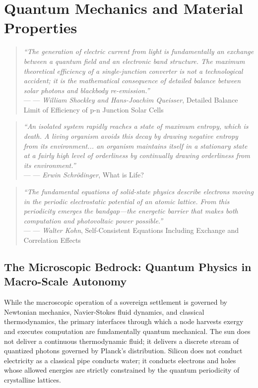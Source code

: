 \chapter{Quantum Mechanics and Material Properties}
\label{chap:quantum_mechanics}

\providecommand{\epigraph}[2]{%
  \begin{quote}
    \textit{#1} \\
    \raggedleft--- #2
  \end{quote}
}

\epigraph{
    ``The generation of electric current from light is fundamentally an exchange between a quantum field and an electronic band structure. The maximum theoretical efficiency of a single-junction converter is not a technological accident; it is the mathematical consequence of detailed balance between solar photons and blackbody re-emission.''
}{--- \textit{William Shockley and Hans-Joachim Queisser}, \textnormal{Detailed Balance Limit of Efficiency of p-n Junction Solar Cells} \cite{shockley1961detailed}}

\epigraph{
    ``An isolated system rapidly reaches a state of maximum entropy, which is death. A living organism avoids this decay by drawing negative entropy from its environment... an organism maintains itself in a stationary state at a fairly high level of orderliness by continually drawing orderliness from its environment.''
}{--- \textit{Erwin Schr\"odinger}, \textnormal{What is Life?} \cite{schrodinger1944life}}

\epigraph{
    ``The fundamental equations of solid-state physics describe electrons moving in the periodic electrostatic potential of an atomic lattice. From this periodicity emerges the bandgap---the energetic barrier that makes both computation and photovoltaic power possible.''
}{--- \textit{Walter Kohn}, \textnormal{Self-Consistent Equations Including Exchange and Correlation Effects} \cite{kohn1965self}}

\section{The Microscopic Bedrock: Quantum Physics in Macro-Scale Autonomy}

While the macroscopic operation of a sovereign settlement is governed by Newtonian mechanics, Navier-Stokes fluid dynamics, and classical thermodynamics, the primary interfaces through which a node harvests exergy and executes computation are fundamentally quantum mechanical. The sun does not deliver a continuous thermodynamic fluid; it delivers a discrete stream of quantized photons governed by Planck's distribution. Silicon does not conduct electricity as a classical pipe conducts water; it conducts electrons and holes whose allowed energies are strictly constrained by the quantum periodicity of crystalline lattices.

